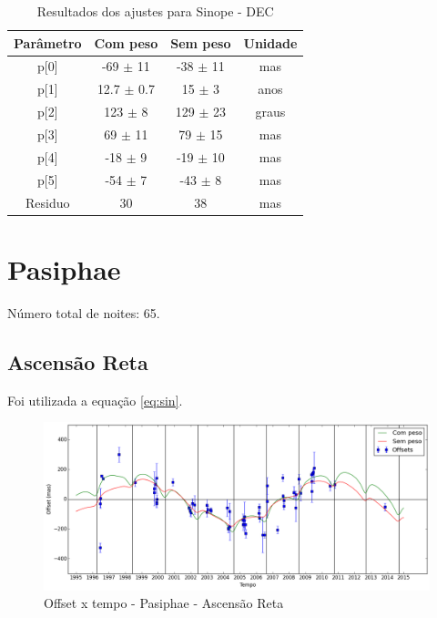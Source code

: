 \documentclass[11pt,a4paper]{report}
\begin{document}
\begin{table}[h!]
\caption{\label{Tab: Sinope-DEC} Resultados dos ajustes para Sinope - DEC}
\begin{centering}
\begin{tabular}{cccc}
\hline
\hline
Parâmetro & Com peso & Sem peso & Unidade\tabularnewline
\hline
p[0] & -69 $\pm$ 11 & -38 $\pm$ 11 & mas\\
p[1] & 12.7 $\pm$ 0.7 & 15 $\pm$ 3 & anos\\
p[2] & 123 $\pm$ 8 & 129 $\pm$ 23 & graus\\
p[3] & 69 $\pm$ 11 & 79 $\pm$ 15 & mas\\
p[4] & -18 $\pm$ 9 & -19 $\pm$ 10 & mas\\
p[5] & -54 $\pm$ 7 & -43 $\pm$ 8 & mas\\
Residuo & 30 & 38 & mas\\
\hline 
\end{tabular} 
\par\end{centering}
\end{table}

\chapter*{Pasiphae}

\indent \indent Número total de noites: 65.

\section*{Ascensão Reta}

Foi utilizada a equação \ref{eq:sin}.

\begin{figure}[h]
\caption{Offset x tempo - Pasiphae - Ascensão Reta}
\includegraphics[scale=0.45]{Pasiphae/RA.png} 
\end{figure}
\end{document}
